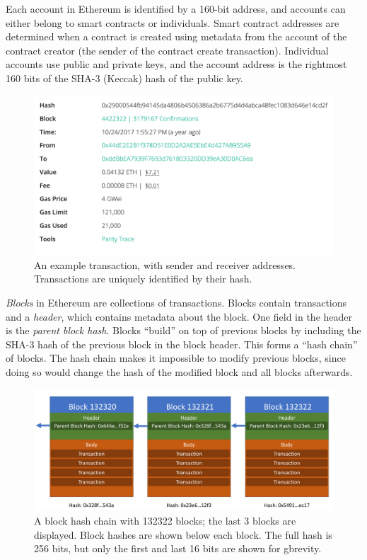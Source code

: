 \documentclass[12pt]{article}
\begin{document}
Each account in Ethereum is identified by a 160-bit address, and accounts can either belong to smart contracts or individuals. Smart contract addresses are determined when a contract is created using metadata from the account of the contract creator (the sender of the contract create transaction). Individual accounts use public and private keys, and the account address is the rightmost 160 bits of the SHA-3 (Keccak) hash of the public key. %

\begin{figure}[H]
  \centering
  \includegraphics[width=\textwidth]{../figures/background/transactions/example_transaction.png}
  \caption{An example transaction, with sender and receiver addresses. Transactions are uniquely identified by their hash.}
\end{figure}

\emph{Blocks} in Ethereum are collections of transactions. Blocks contain transactions and a \emph{header}, which contains metadata about the block. One field in the header is the \emph{parent block hash}. Blocks ``build'' on top of previous blocks by including the SHA-3 hash of the previous block in the block header. This forms a ``hash chain'' of blocks. The hash chain makes it impossible to modify previous blocks, since doing so would change the hash of the modified block and all blocks afterwards.

\begin{figure}[H]
  \centering
  \includegraphics[width=\textwidth]{../figures/background/blocks/blocks.pdf}
  \caption{A block hash chain with 132322 blocks; the last 3 blocks are displayed. Block hashes are shown below each block. The full hash is 256 bits, but only the first and last 16 bits are shown for gbrevity.}
\end{figure}
\end{document}

